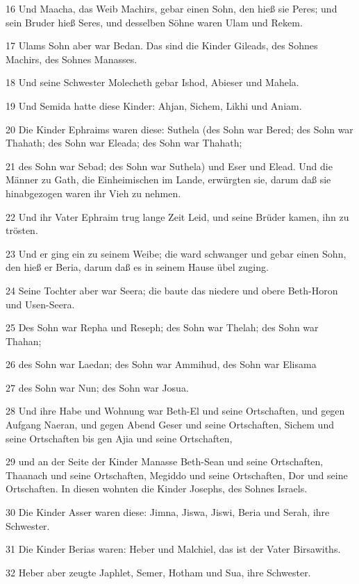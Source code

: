 \par 16 Und Maacha, das Weib Machirs, gebar einen Sohn, den hieß sie Peres; und sein Bruder hieß Seres, und desselben Söhne waren Ulam und Rekem.
\par 17 Ulams Sohn aber war Bedan. Das sind die Kinder Gileads, des Sohnes Machirs, des Sohnes Manasses.
\par 18 Und seine Schwester Molecheth gebar Ishod, Abieser und Mahela.
\par 19 Und Semida hatte diese Kinder: Ahjan, Sichem, Likhi und Aniam.
\par 20 Die Kinder Ephraims waren diese: Suthela (des Sohn war Bered; des Sohn war Thahath; des Sohn war Eleada; des Sohn war Thahath;
\par 21 des Sohn war Sebad; des Sohn war Suthela) und Eser und Elead. Und die Männer zu Gath, die Einheimischen im Lande, erwürgten sie, darum daß sie hinabgezogen waren ihr Vieh zu nehmen.
\par 22 Und ihr Vater Ephraim trug lange Zeit Leid, und seine Brüder kamen, ihn zu trösten.
\par 23 Und er ging ein zu seinem Weibe; die ward schwanger und gebar einen Sohn, den hieß er Beria, darum daß es in seinem Hause übel zuging.
\par 24 Seine Tochter aber war Seera; die baute das niedere und obere Beth-Horon und Usen-Seera.
\par 25 Des Sohn war Repha und Reseph; des Sohn war Thelah; des Sohn war Thahan;
\par 26 des Sohn war Laedan; des Sohn war Ammihud, des Sohn war Elisama
\par 27 des Sohn war Nun; des Sohn war Josua.
\par 28 Und ihre Habe und Wohnung war Beth-El und seine Ortschaften, und gegen Aufgang Naeran, und gegen Abend Geser und seine Ortschaften, Sichem und seine Ortschaften bis gen Ajia und seine Ortschaften,
\par 29 und an der Seite der Kinder Manasse Beth-Sean und seine Ortschaften, Thaanach und seine Ortschaften, Megiddo und seine Ortschaften, Dor und seine Ortschaften. In diesen wohnten die Kinder Josephs, des Sohnes Israels.
\par 30 Die Kinder Asser waren diese: Jimna, Jiswa, Jiswi, Beria und Serah, ihre Schwester.
\par 31 Die Kinder Berias waren: Heber und Malchiel, das ist der Vater Birsawiths.
\par 32 Heber aber zeugte Japhlet, Semer, Hotham und Sua, ihre Schwester.
